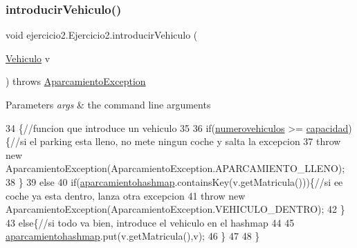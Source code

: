 \subsubsection{\texorpdfstring{introducir\+Vehiculo()}{introducirVehiculo()}}
{\footnotesize\ttfamily void ejercicio2.\+Ejercicio2.\+introducir\+Vehiculo (\begin{DoxyParamCaption}\item[{\mbox{\hyperlink{classejercicio2_1_1_vehiculo}{Vehiculo}}}]{v }\end{DoxyParamCaption}) throws \mbox{\hyperlink{classejercicio2_1_1_aparcamiento_exception}{Aparcamiento\+Exception}}\hspace{0.3cm}{\ttfamily [inline]}}


\begin{DoxyParams}{Parameters}
{\em args} & the command line arguments \\
\hline
\end{DoxyParams}

\begin{DoxyCode}
34                                                                             \{\textcolor{comment}{//funcion que introduce un
       vehiculo}
35         
36         \textcolor{keywordflow}{if}(\mbox{\hyperlink{classejercicio2_1_1_ejercicio2_a6c3fa58fad90cecd34b87678894782d6}{numerovehiculos}} >= \mbox{\hyperlink{classejercicio2_1_1_ejercicio2_a67160aed137820bd3e65ebd3a709ace7}{capacidad}})\{\textcolor{comment}{//si el parking esta lleno, no mete ningun
       coche y salta la excepcion}
37             \textcolor{keywordflow}{throw} \textcolor{keyword}{new} AparcamientoException(AparcamientoException.APARCAMIENTO\_LLENO);
38         \}
39         \textcolor{keywordflow}{else}
40         \textcolor{keywordflow}{if}(\mbox{\hyperlink{classejercicio2_1_1_ejercicio2_aa5edc1e53d504e830b43940e31c3f33a}{aparcamientohashmap}}.containsKey(v.getMatricula()))\{\textcolor{comment}{//si ee coche ya esta
       dentro, lanza otra excepcion}
41             \textcolor{keywordflow}{throw} \textcolor{keyword}{new} AparcamientoException(AparcamientoException.VEHICULO\_DENTRO);
42         \}
43         \textcolor{keywordflow}{else}\{\textcolor{comment}{//si todo va bien, introduce el vehiculo en el hashmap}
44             
45         \mbox{\hyperlink{classejercicio2_1_1_ejercicio2_aa5edc1e53d504e830b43940e31c3f33a}{aparcamientohashmap}}.put(v.getMatricula(),v);
46         \}
47         
48         \}
\end{DoxyCode}
\mbox{\label{classejercicio2_1_1_ejercicio2_abdd1ba43b76660e71d07c129449fcf6f}} 
